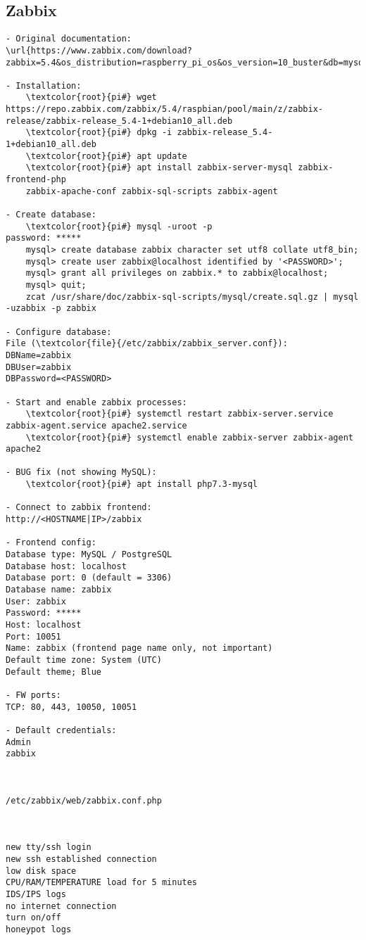 \documentclass[10pt, a4paper, onecolumn, openany]{book} %
\begin{document}
\subsection{Zabbix}
\begin{Verbatim}[commandchars=\\\{\}]
- Original documentation:
\url{https://www.zabbix.com/download?zabbix=5.4&os_distribution=raspberry_pi_os&os_version=10_buster&db=mysql&ws=apache}

- Installation:
    \textcolor{root}{pi#} wget https://repo.zabbix.com/zabbix/5.4/raspbian/pool/main/z/zabbix-release/zabbix-release_5.4-1+debian10_all.deb
    \textcolor{root}{pi#} dpkg -i zabbix-release_5.4-1+debian10_all.deb
    \textcolor{root}{pi#} apt update 
    \textcolor{root}{pi#} apt install zabbix-server-mysql zabbix-frontend-php 
    zabbix-apache-conf zabbix-sql-scripts zabbix-agent 

- Create database:
    \textcolor{root}{pi#} mysql -uroot -p
password: *****
    mysql> create database zabbix character set utf8 collate utf8_bin;
    mysql> create user zabbix@localhost identified by '<PASSWORD>';
    mysql> grant all privileges on zabbix.* to zabbix@localhost;
    mysql> quit;
    zcat /usr/share/doc/zabbix-sql-scripts/mysql/create.sql.gz | mysql -uzabbix -p zabbix

- Configure database:
File (\textcolor{file}{/etc/zabbix/zabbix_server.conf}):
DBName=zabbix
DBUser=zabbix
DBPassword=<PASSWORD> 

- Start and enable zabbix processes:
    \textcolor{root}{pi#} systemctl restart zabbix-server.service zabbix-agent.service apache2.service 
    \textcolor{root}{pi#} systemctl enable zabbix-server zabbix-agent apache2 

- BUG fix (not showing MySQL):
    \textcolor{root}{pi#} apt install php7.3-mysql

- Connect to zabbix frontend:
http://<HOSTNAME|IP>/zabbix
 
- Frontend config:
Database type: MySQL / PostgreSQL
Database host: localhost
Database port: 0 (default = 3306)
Database name: zabbix
User: zabbix
Password: *****
Host: localhost
Port: 10051
Name: zabbix (frontend page name only, not important)
Default time zone: System (UTC)
Default theme; Blue

- FW ports:
TCP: 80, 443, 10050, 10051

- Default credentials:
Admin
zabbix



/etc/zabbix/web/zabbix.conf.php



new tty/ssh login
new ssh established connection
low disk space
CPU/RAM/TEMPERATURE load for 5 minutes
IDS/IPS logs
no internet connection
turn on/off
honeypot logs
\end{Verbatim}
\end{document}
